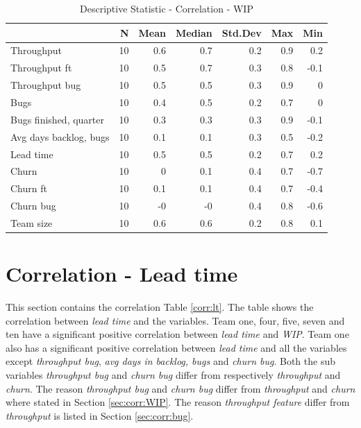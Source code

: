 \documentclass[UKenglish]{ifimaster}  %
\begin{document}
\begin{table}[!htbp]
 \centering
 \begin{tabular}{ | l | r | r | r | r | r | r | }
 \hline
& \bf{N} & \bf{Mean} & \bf{Median} & \bf{Std.Dev} & \bf{Max} & \bf{Min} \\ \hline
Throughput  & 10 & 0.6 & 0.7 & 0.2 & 0.9 & 0.2\\ \hline
Throughput ft  & 10 & 0.5 & 0.7 & 0.3 & 0.8 & -0.1\\ \hline
Throughput bug  & 10 & 0.5 & 0.5 & 0.3 & 0.9 & 0\\ \hline
Bugs  & 10 & 0.4 & 0.5 & 0.2 & 0.7 & 0\\ \hline
Bugs finished, quarter  & 10 & 0.3 & 0.3 & 0.3 & 0.9 & -0.1\\ \hline
Avg days backlog, bugs  & 10 & 0.1 & 0.1 & 0.3 & 0.5 & -0.2\\ \hline
Lead time & 10 & 0.5 & 0.5 & 0.2 & 0.7 & 0.2\\ \hline
Churn  & 10 & 0 & 0.1 & 0.4 & 0.7 & -0.7\\ \hline
Churn ft  & 10 & 0.1 & 0.1 & 0.4 & 0.7 & -0.4\\ \hline
Churn bug  & 10 & -0 & -0 & 0.4 & 0.8 & -0.6\\ \hline
Team size  & 10 & 0.6 & 0.6 & 0.2 & 0.8 & 0.1\\ \hline
\end{tabular}
 \caption{Descriptive Statistic - Correlation - WIP}
 \label{DS:corr:WIP}
 \end{table}




\section{Correlation - Lead time}
\label{sec:corr:lt}
This section contains the correlation Table \ref{corr:lt}. The table shows the correlation between \textit{lead time} and the variables. Team one, four, five, seven and ten have a significant positive correlation between \textit{lead time} and \textit{WIP}. Team one also has a significant positive correlation between \textit{lead time} and all the variables except \textit{throughput bug}, \textit{avg days in backlog, bugs} and \textit{churn bug}. Both the sub variables \textit{throughput bug} and \textit{churn bug} differ from respectively \textit{throughput} and \textit{churn}. The reason \textit{throughput bug} and \textit{churn bug} differ from \textit{throughput} and \textit{churn} where stated in Section \ref{sec:corr:WIP}.  The reason \textit{throughput feature} differ from \textit{throughput} is listed in Section \ref{sec:corr:bug}.
\end{document}
